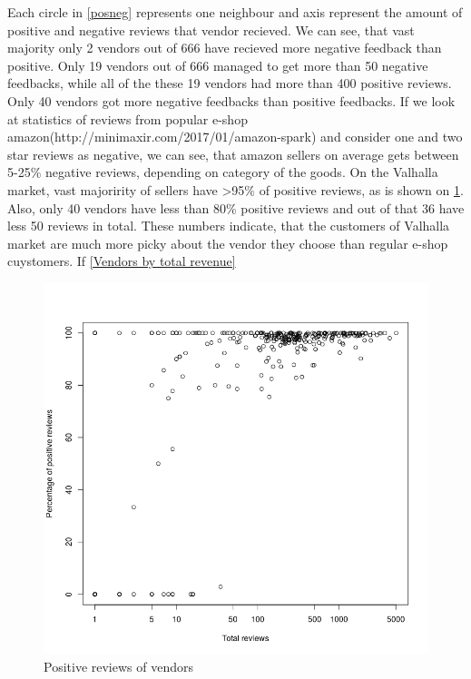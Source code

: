 \documentclass[
  digital, %
  table,   %
  lof,     %
  lot,     %
  oneside
]{fithesis3}
\begin{document}
Each circle in \ref{posneg} represents one neighbour and axis represent
the amount of positive and negative reviews that vendor recieved. 
We can see, that vast majority only 2 vendors out of 666 have recieved more negative feedback than positive.
Only 19 vendors out of 666 managed to get more than 50 negative feedbacks, while all of the these 19 vendors had more
 than 400 positive reviews.
Only 40 vendors got more negative feedbacks than positive feedbacks.
 If we look at statistics of reviews from popular e-shop amazon(http://minimaxir.com/2017/01/amazon-spark)
  and consider one and two star reviews as negative, we can see, that amazon sellers on
  average gets between 5-25\% negative reviews, depending on category of the goods.
  On the Valhalla market, vast majoririty of sellers have >95\% of positive reviews, as is shown on \ref{pospercent}.
  Also, only 40 vendors have less than 80\% positive reviews and out of that 36 have less 50 reviews in total.
  These numbers indicate, that the customers of Valhalla market are much more picky about the vendor they choose than regular e-shop cuystomers. If \ref{Vendors by total revenue}
  

\begin{figure}[!htb]
    \centering
    \includegraphics[scale=0.4]{pospercent}
    \caption{Positive reviews of vendors}
    \label{pospercent}
\end{figure}
\end{document}
